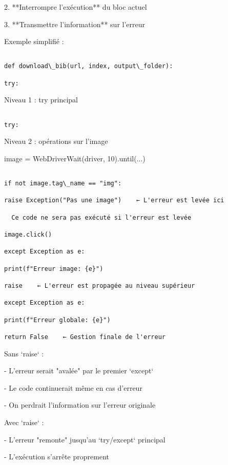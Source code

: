 2. **Interrompre l'exécution** du bloc actuel

3. **Transmettre l'information** sur l'erreur

Exemple simplifié :

\begin{verbatim}

def download\_bib(url, index, output\_folder):

try:

\end{verbatim}

  Niveau 1 : try principal

\begin{verbatim}

try:

\end{verbatim}

  Niveau 2 : opérations sur l'image

image = WebDriverWait(driver, 10).until(...)

\begin{verbatim}

if not image.tag\_name == "img":

raise Exception("Pas une image")    ← L'erreur est levée ici

  Ce code ne sera pas exécuté si l'erreur est levée

image.click()

except Exception as e:

print(f"Erreur image: {e}")

raise    ← L'erreur est propagée au niveau supérieur

except Exception as e:

print(f"Erreur globale: {e}")

return False    ← Gestion finale de l'erreur

\end{verbatim}

Sans `raise` :

- L'erreur serait "avalée" par le premier `except`

- Le code continuerait même en cas d'erreur

- On perdrait l'information sur l'erreur originale

Avec `raise` :

- L'erreur "remonte" jusqu'au `try/except` principal

- L'exécution s'arrête proprement


